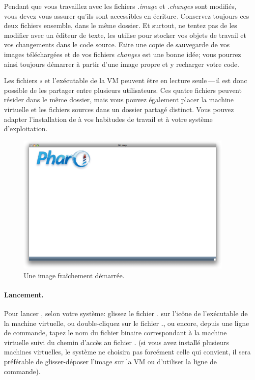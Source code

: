\documentclass[a4paper,10pt,twoside]{book}
\begin{document}
Pendant que vous travaillez avec \pharo les fichiers \emph{.image} et \emph{.changes} sont modifiés, vous devez vous assurer qu'ils sont accessibles en écriture.
Conservez toujours ces deux fichiers ensemble, \cad dans le même dossier.
Et surtout, ne tentez pas de les modifier avec un éditeur de texte, \pharo les utilise pour stocker vos objets de travail et vos changements dans le code source.
Faire une copie de sauvegarde de vos images téléchargées et de vos
fichiers \emph{changes} est une bonne idée; vous pourrez ainsi
toujours démarrer à partir d'une image propre et y recharger votre code.

Les fichiers \emph{s} et l'exécutable de la VM peuvent être
en lecture seule\,---\,il est donc possible de les partager entre plusieurs utilisateurs.
Ces quatre fichiers peuvent résider dans le même dossier, mais vous pouvez également placer la machine virtuelle et les fichiers sources dans un dossier partagé distinct.
Vous pouvez adapter l'installation de \pharo à vos habitudes de travail
et à votre système d'exploitation.

\begin{figure}[htb]
\centerline {\includegraphics[width=0.95\textwidth]{startup}}
\caption{Une image \arevoir{\ppe} fraîchement démarrée.}
\end{figure}


\paragraph{Lancement.} Pour lancer \pharo, selon votre système: glissez
le fichier \emph{.} sur l'icône de l'exécutable de la
machine virtuelle, ou double-cliquez sur le fichier
\emph{.}, ou encore, depuis une ligne de commande,
tapez le nom du fichier binaire correspondant à la machine virtuelle
suivi du chemin d'accès au fichier \emph{.} (si vous
avez installé plusieurs machines virtuelles, le système ne choisira
pas forcément celle qui convient, il sera préférable de
glisser-déposer l'image sur la VM ou d'utiliser la ligne de commande).
\end{document}
